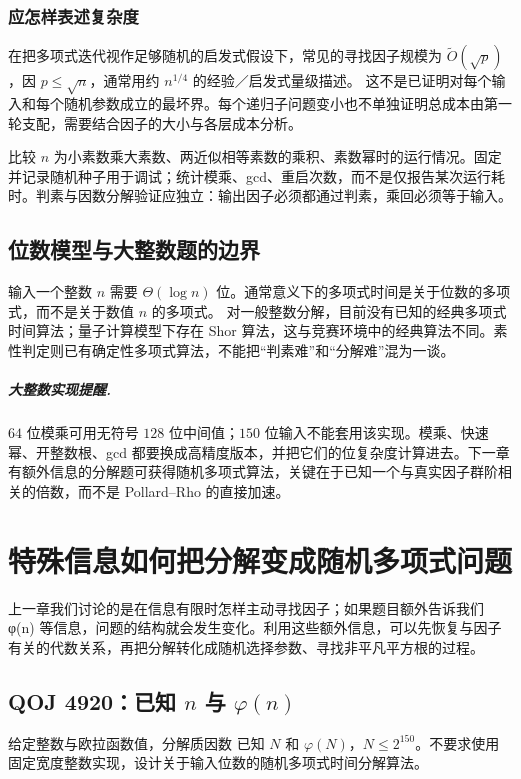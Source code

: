 \documentclass[UTF8,a4paper,11pt,twoside,openright,fontset=fandol]{ctexbook}
\theoremstyle{definition}
\begin{document}
\subsection{应怎样表述复杂度}
在把多项式迭代视作足够随机的启发式假设下，常见的寻找因子规模为 $\widetilde O(\sqrt p)$，因 $p\le\sqrt n$，通常用约 $n^{1/4}$ 的经验／启发式量级描述。
这不是已证明对每个输入和每个随机参数成立的最坏界。每个递归子问题变小也不单独证明总成本由第一轮支配，需要结合因子的大小与各层成本分析。

\begin{teach}[给学生的实验任务]
比较 $n$ 为小素数乘大素数、两近似相等素数的乘积、素数幂时的运行情况。固定并记录随机种子用于调试；统计模乘、gcd、重启次数，而不是仅报告某次运行耗时。判素与因数分解验证应独立：输出因子必须都通过判素，乘回必须等于输入。
\end{teach}


\section{位数模型与大整数题的边界}
输入一个整数 $n$ 需要 $\Theta(\log n)$ 位。通常意义下的多项式时间是关于位数的多项式，而不是关于数值 $n$ 的多项式。
对一般整数分解，目前没有已知的经典多项式时间算法；量子计算模型下存在 Shor 算法，这与竞赛环境中的经典算法不同。素性判定则已有确定性多项式算法，不能把“判素难”和“分解难”混为一谈。

\paragraph{大整数实现提醒.} $64$ 位模乘可用无符号 $128$ 位中间值；$150$ 位输入不能套用该实现。模乘、快速幂、开整数根、gcd 都要换成高精度版本，并把它们的位复杂度计算进去。下一章有额外信息的分解题可获得随机多项式算法，关键在于已知一个与真实因子群阶相关的倍数，而不是 Pollard--Rho 的直接加速。



\chapter{特殊信息如何把分解变成随机多项式问题}
\begin{chapterintro}[章节导读]
上一章我们讨论的是在信息有限时怎样主动寻找因子；如果题目额外告诉我们 φ(n) 等信息，问题的结构就会发生变化。利用这些额外信息，可以先恢复与因子有关的代数关系，再把分解转化成随机选择参数、寻找非平凡平方根的过程。
\end{chapterintro}

\section{QOJ 4920：已知 \texorpdfstring{$n$}{n} 与 \texorpdfstring{$\varphi(n)$}{phi(n)}}
\begin{problem}{给定整数与欧拉函数值，分解质因数}
已知 $N$ 和 $\varphi(N)$，$N\le2^{150}$。不要求使用固定宽度整数实现，设计关于输入位数的随机多项式时间分解算法。
\end{problem}
\end{document}
